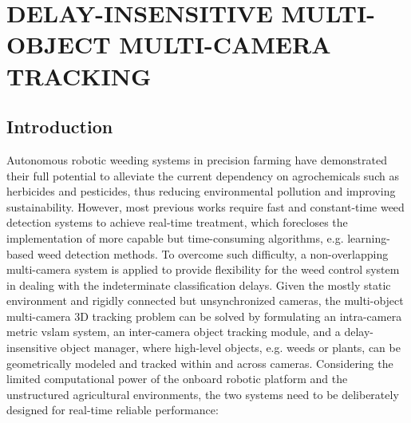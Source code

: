 \chapter{DELAY-INSENSITIVE MULTI-OBJECT MULTI-CAMERA TRACKING}

\section{Introduction}
Autonomous robotic weeding systems in precision farming have demonstrated their full potential to alleviate the current dependency on agrochemicals such as herbicides and pesticides, thus reducing environmental pollution and improving sustainability. 
However, most previous works require fast and constant-time weed detection systems to achieve real-time treatment, which forecloses the implementation of more capable but time-consuming algorithms, e.g. learning-based weed detection methods. 
To overcome such difficulty, a non-overlapping multi-camera system is applied to provide flexibility for the weed control system in dealing with the indeterminate classification delays.
Given the mostly static environment and rigidly connected but unsynchronized cameras, the multi-object multi-camera 3D tracking problem can be solved by formulating an intra-camera metric \acrshort{vslam} system, an inter-camera object tracking module, and a delay-insensitive object manager, where high-level objects, e.g. weeds or plants, can be geometrically modeled and tracked within and across cameras.
Considering the limited computational power of the onboard robotic platform and the unstructured agricultural environments, the two systems need to be deliberately designed for real-time reliable performance:

